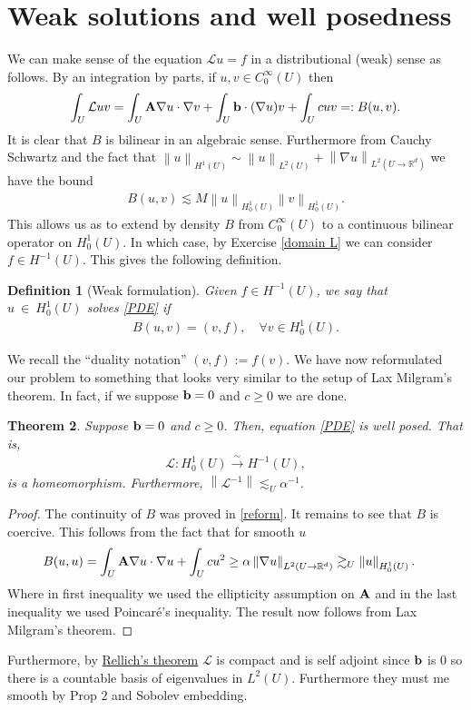 \documentclass[
    a4paper,
    DIV=14,
    abstract=true,
    numbers=noenddot
]
{scrartcl}
\newtheorem{theorem}{Theorem}[section]
\newtheorem{definition}[theorem]{Definition}
\theoremstyle{definition}
\renewcommand{\norm}[1]{\left\lVert #1 \right\rVert}\renewcommand{\abs}[1]{\left| #1 \right|}
\newcommand{\iso}{\xrightarrow{\sim}}
\newcommand{\R}{\mathbb{R}}
\newcommand{\Ll}{\mathcal{L}}
\begin{document}
\section{Weak solutions and well posedness}
We can make sense of the equation $\Ll u =f$ in a distributional (weak) sense as follows.
By an integration by parts, if $u,v \in  C_0^\infty(U)$ then \begin{align*}
	\int_{U} \Ll u v =\int_{U}\vb{A} \nabla u \cdot \nabla v + \int_{U} \vb{b} \cdot ( \nabla  u) v + \int_{U} cuv=: B(u,v)   .
\end{align*}
It is clear that $B$ is bilinear in an algebraic sense. Furthermore from Cauchy Schwartz and  the fact that $\norm{u}_{H^1(U)}\sim \norm{u}_{L^2(U)}+\norm{\nabla u}_{L^2(U\to \R^d)}$ we have the bound
\begin{align}\label{cont B}
	B(u,v)\lesssim M \norm{u}_{H_0^1(U)}\norm{v}_{H_0^1(U)}.
\end{align}
This allows us as to extend by density $B$ from $C_0^\infty(U)$ to a continuous bilinear operator on  $H^1_0(U)$. In which case, by Exercise \ref{domain L} we can consider $f \in H^{-1}(U)$. This gives the following definition.
\begin{definition}[Weak formulation]
	Given $f \in  H^{-1}(U)$, we say that $u~\in~H_0^1(U)$ solves \eqref{PDE} if
	\begin{align}\label{reform}
		B(u,v)= (v,f) , \quad\forall v \in  H^{1}_0(U).
	\end{align}
\end{definition}
We recall the ``duality notation'' $(v,f):= f(v)$. We have now reformulated our problem to something that looks very similar to the setup of Lax Milgram's theorem. In fact, if we suppose $\vb{b}=0$ and $c \geq 0$ we are done.
\begin{theorem}\label{well posed 1}
	Suppose $\vb{b}=0$  and $c \geq 0$. Then, equation \eqref{PDE} is well posed. That is,
	\begin{align*}
		\Ll : H_0^1(U) \iso  H^{-1}(U),
	\end{align*}
	is a homeomorphism. Furthermore, $\norm{\Ll^{-1}} \lesssim_U \alpha ^{-1}$.
\end{theorem}
\begin{proof}
	The continuity of $B$ was proved in  \eqref{reform}. It remains to see that $B$ is coercive. This follows from the fact that for smooth $u$
	\begin{align}\label{b=0}
		B(u,u) & = \int_{U}\vb{A} \nabla u \cdot \nabla u + \int_{U} cu^2 \geq \alpha \norm{\nabla u}_{L^2(U \to \R^d)} \gtrsim_U \norm{u}_{H^1_0(U)}.
	\end{align}
	Where in first inequality we used the ellipticity assumption on $\vb{A}$ and in the last inequality we used Poincaré's inequality. The result now follows from Lax Milgram's theorem.
\end{proof}
Furthermore, by \href{https://nowheredifferentiable.com/2023-07-12-PDEs-3-Sobolev_spaces/#:~:text=Theorem%2014%20(-,Rellich,-for%20trace%200}{Rellich's theorem} $\Ll$ is compact and is self adjoint since $\vb{b}$ is  $0$ so there is a countable basis of eigenvalues in  $L^2(U)$. Furthermore they must me smooth by Prop  $2$ and Sobolev embedding.
\end{document}
